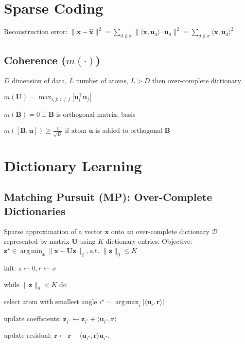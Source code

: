 \documentclass[a4paper, 11pt, landscape]{article}
\DeclareMathOperator*{\argmin}{arg\,min}
\DeclareMathOperator*{\argmax}{arg\,max}
\begin{document}
\begin{multicols*}{3}
\section{Sparse Coding}
Reconstruction error: $\|\mathbf{x}-\mathbf{\hat{x}}\|^2 = \sum_{d\notin\sigma}\| \langle\mathbf{x},\mathbf{u}_d \rangle \cdot \mathbf{u}_d \|^2 = \sum_{d\notin\sigma}\langle\mathbf{x},\mathbf{u}_d\rangle ^2$

\subsection{Coherence ($m(\cdot)$)}
\begin{inparaitem}[\color{red}\textbullet]
	\item $D$ dimension of data, $L$ number of atoms, $L > D$ then over-complete dictionary
	\item $m(\mathbf{U}) = \max_{i,j:\, i \neq j} | \mathbf{u}_i^\top \mathbf{u}_j |$
	\item $m(\mathbf{B}) = 0$ if $\mathbf{B}$ is orthogonal matrix; basis
	\item $m([\mathbf{B}, \mathbf{u}]) \geq \frac{1}{\sqrt{D}}$ if atom $\mathbf{u}$ is added to orthogonal $\mathbf{B}$
\end{inparaitem}


\section{Dictionary Learning}

\subsection{Matching Pursuit (MP): Over-Complete Dictionaries}
Sparse approximation of a vector $\mathbf{x}$ onto an over-complete dictionary $\mathcal{D}$ represented by matrix $\mathbf{U}$ using $K$ dictionary entries.
Objective: $\mathbf{z}^\star \in \argmin_{\mathbf{z}} \|\mathbf{x} - \mathbf{Uz} \|_2$, s.t. $\|\mathbf{z}\|_0 \leq K$
\begin{compactenum}
	\item init: $z \leftarrow 0, r \leftarrow x$
	\item while $\|\mathbf{z}\|_0 < K$ do
	\item select atom with smallest angle $i^\star = \argmax_i |\langle \mathbf{u}_i, \mathbf{r} \rangle|$
	\item update coefficients: $\mathbf{z}_{i^\star} \leftarrow \mathbf{z}_{i^\star} + \langle \mathbf{u}_{i^\star}, \mathbf{r} \rangle$
	\item update residual: $\mathbf{r} \leftarrow \mathbf{r} - \langle \mathbf{u}_{i^\star}, \mathbf{r} \rangle \mathbf{u}_{i^\star}$.
\end{compactenum}


\end{multicols*}
\end{document}
